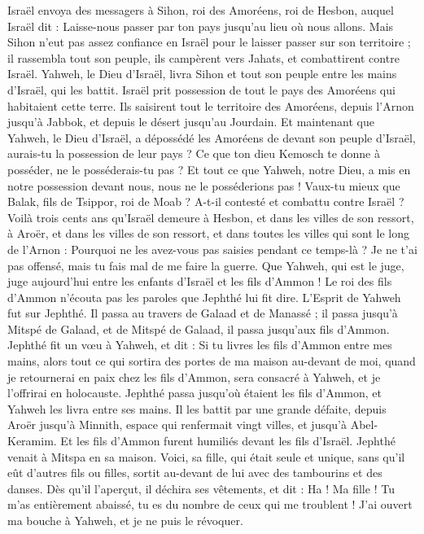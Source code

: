 \begin{multicols}{2}
Israël envoya des messagers à Sihon, roi des Amoréens, roi de Hesbon, auquel Israël dit : Laisse-nous passer par ton pays jusqu'au lieu où nous allons.
Mais Sihon n'eut pas assez confiance en Israël pour le laisser passer sur son territoire ; il rassembla tout son peuple, ils campèrent vers Jahats, et combattirent contre Israël.
Yahweh, le Dieu d'Israël, livra Sihon et tout son peuple entre les mains d'Israël, qui les battit. Israël prit possession de tout le pays des Amoréens qui habitaient cette terre.
Ils saisirent tout le territoire des Amoréens, depuis l'Arnon jusqu'à Jabbok, et depuis le désert jusqu'au Jourdain.
Et maintenant que Yahweh, le Dieu d'Israël, a dépossédé les Amoréens de devant son peuple d'Israël, aurais-tu la possession de leur pays ?
Ce que ton dieu Kemosch te donne à posséder, ne le posséderais-tu pas ? Et tout ce que Yahweh, notre Dieu, a mis en notre possession devant nous, nous ne le posséderions pas !
Vaux-tu mieux que Balak, fils de Tsippor, roi de Moab ? A-t-il contesté et combattu contre Israël ?
Voilà trois cents ans qu'Israël demeure à Hesbon, et dans les villes de son ressort, à Aroër, et dans les villes de son ressort, et dans toutes les villes qui sont le long de l'Arnon : Pourquoi ne les avez-vous pas saisies pendant ce temps-là ?
Je ne t'ai pas offensé, mais tu fais mal de me faire la guerre. Que Yahweh, qui est le juge, juge aujourd'hui entre les enfants d'Israël et les fils d'Ammon !
Le roi des fils d'Ammon n'écouta pas les paroles que Jephthé lui fit dire.
L'Esprit de Yahweh fut sur Jephthé. Il passa au travers de Galaad et de Manassé ; il passa jusqu'à Mitspé de Galaad, et de Mitspé de Galaad, il passa jusqu'aux fils d'Ammon.
Jephthé fit un vœu à Yahweh, et dit : Si tu livres les fils d'Ammon entre mes mains,
alors tout ce qui sortira des portes de ma maison au-devant de moi, quand je retournerai en paix chez les fils d'Ammon, sera consacré à Yahweh, et je l'offrirai en holocauste.
Jephthé passa jusqu'où étaient les fils d'Ammon, et Yahweh les livra entre ses mains.
Il les battit par une grande défaite, depuis Aroër jusqu'à Minnith, espace qui renfermait vingt villes, et jusqu'à Abel-Keramim. Et les fils d'Ammon furent humiliés devant les fils d'Israël.
Jephthé venait à Mitspa en sa maison. Voici, sa fille, qui était seule et unique, sans qu'il eût d'autres fils ou filles, sortit au-devant de lui avec des tambourins et des danses.
Dès qu'il l'aperçut, il déchira ses vêtements, et dit : Ha ! Ma fille ! Tu m'as entièrement abaissé, tu es du nombre de ceux qui me troublent ! J'ai ouvert ma bouche à Yahweh, et je ne puis le révoquer.

\end{multicols}

